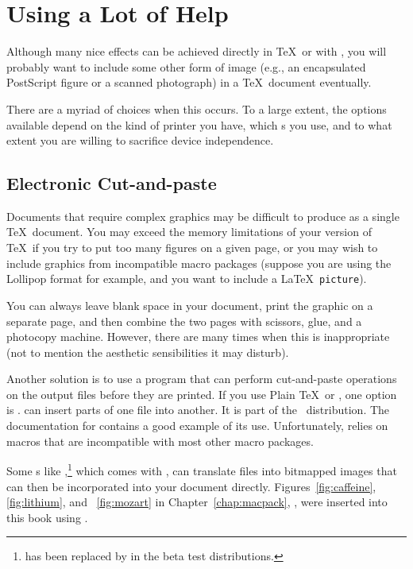 \section{Using a Lot of Help}

Although many nice effects can be achieved directly in \TeX\ or
with \MF, you will probably want to include some other form of image
(e.g., an encapsulated PostScript figure or a scanned photograph) 
in a \TeX\ document eventually.

There are a myriad of choices when this occurs.  To a large extent,
the options available depend on the kind of printer you have,
which \dvidriver{}s you use, and to what extent you are willing
to sacrifice device independence.

\subsection{Electronic Cut-and-paste}

Documents that 
require complex graphics may be difficult to produce
as a single \TeX\ document.  You may exceed the memory
limitations of your version of \TeX\ if you try to put too many
figures on a given page, or you may wish to include graphics
from incompatible macro packages (suppose you are using the 
Lollipop format for example, and you want to include a \LaTeX\
\verb|picture|).

You can always leave blank space in your document, print the graphic
on a separate page, and then combine the two pages with scissors,
glue, and a photocopy machine.  However, there are many times when
this is inappropriate (not to mention the aesthetic sensibilities
it may disturb).

Another solution is to use a program that can perform cut-and-paste
operations on the output files before they are printed.  If you use
Plain \TeX\ or \LamSTeX, one option 
is .  
can insert parts of one  file into another.  It is part of the
\LamSTeX\ distribution.  The documentation for  contains
a good example of its use.  Unfortunately, \program{DVIpaste} relies on
macros that are incompatible with most other macro packages.

Some \dvidriver{}s like ,\footnote{
has been replaced by \program{dvidot} in the beta test distributions.} 
which comes with
\emTeX, can translate  files into bitmapped images that can
then be incorporated into your document directly.  
Figures~\ref{fig:caffeine}, \ref{fig:lithium}, and ~\ref{fig:mozart}
in Chapter~\ref{chap:macpack}, {\it \nameref{chap:macpack}}, were inserted
into this book
using .

